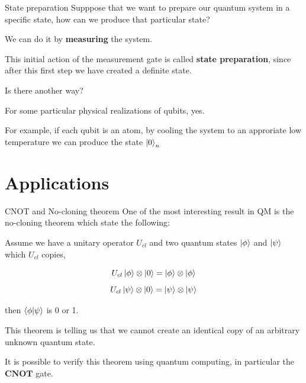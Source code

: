 \documentclass[11p,aspectratio=169]{beamer}
\begin{document}
\begin{frame}{State preparation}
    Supppose that we want to prepare our quantum system in a specific state, how can we produce that
    particular state? 

    \pause 
    We can do it  by \textbf{measuring} the system.
    \pause

    This initial action of the measurement gate is called \textbf{state preparation}, since after this first
    step we have created a definite state.

    Is there another way?

    \pause

    For some particular physical realizations of qubits, yes. 

    For example, if each qubit is an atom, by cooling the system to an approriate low temperature
    we can produce the state $\ket{0}_n$


\end{frame}

\section{Applications}

\begin{frame}{CNOT and No-cloning theorem}
    One of the most interesting result in QM is the no-cloning theorem which state the following:

   \begin{tcolorbox}[title=No-cloning theorem]
    Assume we have a unitary operator $U_{cl}$ and two quantum states $\ket{\phi}$ and $\ket{\psi}$ which
    $U_{cl}$ copies,

    $$ U_{cl} \ket{\phi} \otimes \ket{0} = \ket{\phi} \otimes \ket{\phi}$$
    $$ U_{cl} \ket{\psi} \otimes \ket{0} = \ket{\psi} \otimes \ket{\psi}$$

    then $\bra{\phi} \ket{\psi}$ is 0 or 1.
   \end{tcolorbox}

   This theorem is telling us that we cannot create an identical copy of an arbitrary unknown quantum state.

   It is possible to verify this theorem using quantum computing, in particular the $\textbf{CNOT}$ gate.
\end{frame}
\end{document}
